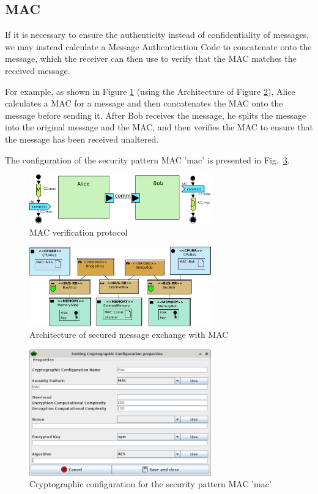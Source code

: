 \documentclass{llncs}
\begin{document}
\subsection{MAC}
If it is necessary to ensure the authenticity instead of confidentiality of messages, we may instead calculate a Message Authentication Code to concatenate onto the message, which the receiver can then use to verify that the MAC matches the received message.

For example, as shown in Figure \ref{fig:macComp} (using the Architecture of Figure \ref{fig:macArch}), Alice calculates a MAC for a message and then concatenates the MAC onto the message before sending it. After Bob receives the message, he splits the message into the original message and the MAC, and then verifies the MAC to ensure that the message has been received unaltered.

The configuration of the security pattern MAC 'mac' is presented in Fig.~\ref{fig:macSecConfig}.
\begin{figure}[htbp]
	\centering	\includegraphics[width=0.7\textwidth]{figures/securityStuff/macComp.pdf}
	\caption{MAC verification protocol}
	\label{fig:macComp}
\end{figure}

\begin{figure}[htbp]
	\centering	\includegraphics[width=0.7\textwidth]{figures/securityStuff/arch_alice_bob_mac.pdf}
	\caption{Architecture of secured message exchange with MAC}
	\label{fig:macArch}
\end{figure}

\begin{figure}[htbp]
	\centering	\includegraphics[width=0.7\textwidth]{figures/securityStuff/encrypt-config-mac.png}
	\caption{Cryptographic configuration for the security pattern MAC 'mac'}
	\label{fig:macSecConfig}
\end{figure}
\end{document}
